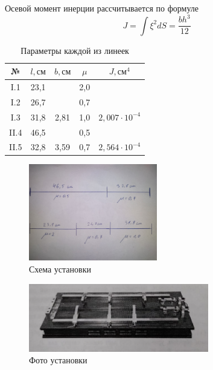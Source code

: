 \documentclass[a4paper,12pt]{article}
\begin{document}
Осевой момент инерции рассчитывается по формуле
\[J = \int \xi^2 dS = \frac{b h^3}{12}\]
\begin{table}[H]\label{tab: DataAndJ}
    \centering
    \begin{tabular}{|c|c|c|c|c|}
        \hline
        {\color[HTML]{000000} №}    & {\color[HTML]{000000} $l, см$} & {\color[HTML]{000000} $b, см$} & {\color[HTML]{000000} $\mu$} & {\color[HTML]{000000} $J, см^4$} \\ \hline
        {\color[HTML]{000000} I.1}  & {\color[HTML]{000000} 23,1}  & {\color[HTML]{000000} }      & {\color[HTML]{000000} 2,0} & {\color[HTML]{000000} }        \\ \cline{1-2} \cline{4-4}
        {\color[HTML]{000000} I.2}  & {\color[HTML]{000000} 26,7}  & {\color[HTML]{000000} }      & {\color[HTML]{000000} 0,7} & {\color[HTML]{000000} }        \\ \cline{1-2} \cline{4-4}
        {\color[HTML]{000000} I.3} &
          {\color[HTML]{000000} 31,8} &
          \multirow{-3}{*}{{\color[HTML]{000000} 2,81}} &
          {\color[HTML]{000000} 1,0} &
          \multirow{-3}{*}{{\color[HTML]{000000} $2,007 \cdot 10^{-4}$}} \\ \hline
        {\color[HTML]{000000} II.4} & {\color[HTML]{000000} 46,5}  & {\color[HTML]{000000} }      & {\color[HTML]{000000} 0,5} & {\color[HTML]{000000} }        \\ \cline{1-2} \cline{4-4}
        {\color[HTML]{000000} II.5} &
          {\color[HTML]{000000} 32,8} &
          \multirow{-2}{*}{{\color[HTML]{000000} 3,59}} &
          {\color[HTML]{000000} 0,7} &
          \multirow{-2}{*}{{\color[HTML]{000000} $2,564 \cdot 10^{-4}$}} \\ \hline
    \end{tabular}
    \caption{Параметры каждой из линеек}
\end{table}

\begin{figure}[H]\label{fig: UstanovkaScheme}
    \centering
    \includegraphics[width = 0.5\textwidth, angle = 90]{UstanovkaScheme.png}
    \caption{Схема установки}
\end{figure}
\begin{figure}[H]\label{fig: UstanovkaPhoto}
    \centering
    \includegraphics[width = 0.7\textwidth]{UstanovkaPhoto.png}
    \caption{Фото установки}
\end{figure}
\end{document}
